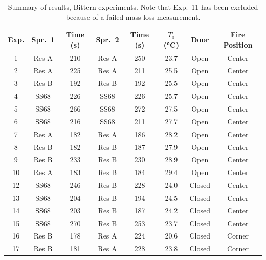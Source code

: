 \begin{table}[!ht]
\centering
\caption[Summary of results, Bittern experiments]{Summary of results, Bittern experiments. Note that Exp.~11 has been excluded because of a failed mass loss measurement.}
\label{bit_sum}
\begin{tabular}{|c|c|c|c|c|c|c|c|}
\hline
Exp. & Spr.~1 & Time (s) & Spr.~2 & Time (s) & $T_0$ (\unit{\degreeCelsius}) & Door   & Fire Position \\ \hline \hline
1    & Res A  & 210      & Res A  & 250      & 23.7              & Open   & Center        \\ \hline
2    & Res A  & 225      & Res A  & 211      & 25.5              & Open   & Center        \\ \hline
3    & Res B  & 192      & Res B  & 192      & 25.5              & Open   & Center        \\ \hline
4    & SS68   & 226      & SS68   & 226      & 25.7              & Open   & Center        \\ \hline
5    & SS68   & 266      & SS68   & 272      & 27.5              & Open   & Center        \\ \hline
6    & SS68   & 216      & SS68   & 211      & 27.7              & Open   & Center        \\ \hline
7    & Res A  & 182      & Res A  & 186      & 28.2              & Open   & Center        \\ \hline
8    & Res B  & 182      & Res B  & 187      & 27.9              & Open   & Center        \\ \hline
9    & Res B  & 233      & Res B  & 230      & 28.9              & Open   & Center        \\ \hline
10   & Res A  & 183      & Res B  & 184      & 29.4              & Open   & Center        \\ \hline
12   & SS68   & 246      & Res B  & 228      & 24.0              & Closed & Center        \\ \hline
13   & SS68   & 204      & Res B  & 194      & 24.5              & Closed & Center        \\ \hline
14   & SS68   & 203      & Res B  & 187      & 24.2              & Closed & Center        \\ \hline
15   & SS68   & 270      & Res B  & 253      & 23.7              & Closed & Center        \\ \hline
16   & Res B  & 178      & Res A  & 224      & 20.6              & Closed & Corner        \\ \hline
17   & Res B  & 181      & Res A  & 228      & 23.8              & Closed & Corner        \\ \hline

\end{tabular}
\end{table}
